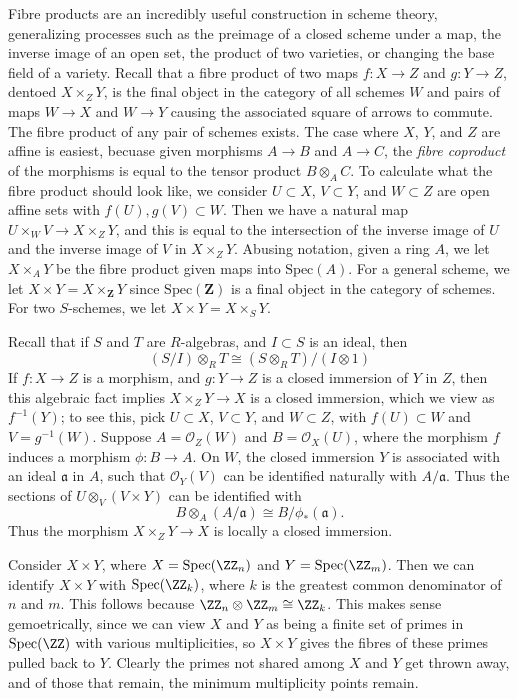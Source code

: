 Fibre products are an incredibly useful construction in scheme theory, generalizing processes such as the preimage of a closed scheme under a map, the inverse image of an open set, the product of two varieties, or changing the base field of a variety. Recall that a fibre product of two maps $f: X \to Z$ and $g: Y \to Z$, dentoed $X \times_Z Y$, is the final object in the category of all schemes $W$ and pairs of maps $W \to X$ and $W \to Y$ causing the associated square of arrows to commute. The fibre product of any pair of schemes exists. The case where $X$, $Y$, and $Z$ are affine is easiest, becuase given morphisms $A \to B$ and $A \to C$, the \emph{fibre coproduct} of the morphisms is equal to the tensor product $B \otimes_A C$. To calculate what the fibre product should look like, we consider $U \subset X$, $V \subset Y$, and $W \subset Z$ are open affine sets with $f(U), g(V) \subset W$. Then we have a natural map $U \times_W V \to X \times_Z Y$, and this is equal to the intersection of the inverse image of $U$ and the inverse image of $V$ in $X \times_Z Y$. Abusing notation, given a ring $A$, we let $X \times_A Y$ be the fibre product given maps into $\text{Spec}(A)$. For a general scheme, we let $X \times Y = X \times_{\mathbf{Z}} Y$ since $\text{Spec}(\mathbf{Z})$ is a final object in the category of schemes. For two $S$-schemes, we let $X \times Y = X \times_S Y$.

Recall that if $S$ and $T$ are $R$-algebras, and $I \subset S$ is an ideal, then
%
\[ (S/I) \otimes_R T \cong (S \otimes_R T)/(I \otimes 1) \]
%
If $f: X \to Z$ is a morphism, and $g: Y \to Z$ is a closed immersion of $Y$ in $Z$, then this algebraic fact implies $X \times_Z Y \to X$ is a closed immersion, which we view as $f^{-1}(Y)$; to see this, pick $U \subset X$, $V \subset Y$, and $W \subset Z$, with $f(U) \subset W$ and $V = g^{-1}(W)$. Suppose $A = \mathcal{O}_Z(W)$ and $B = \mathcal{O}_X(U)$, where the morphism $f$ induces a morphism $\phi: B \to A$. On $W$, the closed immersion $Y$ is associated with an ideal $\mathfrak{a}$ in $A$, such that $\mathcal{O}_Y(V)$ can be identified naturally with $A/\mathfrak{a}$. Thus the sections of $U \otimes_V (V \times Y)$ can be identified with
%
\[ B \otimes_A (A/\mathfrak{a}) \cong B / \phi_*(\mathfrak{a}). \]
%
Thus the morphism $X \times_Z Y \to X$ is locally a closed immersion.

\begin{example}
    Consider $X \times Y$, where $X = \text{Spec}(\ZZ_n)$ and $Y = \text{Spec}(\ZZ_m)$. Then we can identify $X \times Y$ with $\text{Spec}(\ZZ_k)$, where $k$ is the greatest common denominator of $n$ and $m$. This follows because $\ZZ_n \otimes \ZZ_m \cong \ZZ_k$. This makes sense gemoetrically, since we can view $X$ and $Y$ as being a finite set of primes in $\text{Spec}(\ZZ)$ with various multiplicities, so $X \times Y$ gives the fibres of these primes pulled back to $Y$. Clearly the primes not shared among $X$ and $Y$ get thrown away, and of those that remain, the minimum multiplicity points remain.
\end{example}


